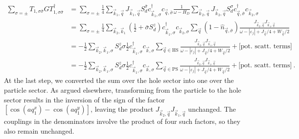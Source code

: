 \documentclass{revtex4-2}
\begin{document}
\begin{equation}\begin{aligned}\label{t1t1h}
	\sum_{\sigma=\pm}T_{1,\sigma\bar\sigma} G T^\dagger_{1,\sigma\bar\sigma} &= \sum_{\sigma=\pm}\frac{1}{4} \sum_{\vec k_1,\vec q}J_{\vec k_1,\vec q} S_d^{\bar\sigma} c^\dagger_{\vec k_1,\sigma} c_{\vec q,\bar\sigma} \frac{1}{\omega - H_D}\sum_{\vec k_2,\vec q}J_{\vec k_2,\vec q} S_d^\sigma c^\dagger_{\vec q,\bar\sigma} c_{\vec k_2,\sigma}\\
										 &= \sum_{\sigma=\pm}\frac{1}{4}\sum_{\vec k_2,\vec k_1} \left(\frac{1}{2} + \bar\sigma S_d^z\right) c^\dagger_{\vec k_1,\sigma} c_{\vec k_2,\sigma} \sum_{\vec q} \left(1 - \hat n_{\vec q,\bar\sigma}\right) \frac{J_{\vec k_2,\vec q} J_{\vec k_1,\vec q}}{\omega - |\varepsilon_j| + J_{\vec q}/4 + W_{\vec q}/2}\\
										 &= -\frac{1}{2}\sum_{\vec k_2,\vec k_1, \sigma} S_d^z \sigma \frac{1}{2}c^\dagger_{\vec k_1,\sigma}c_{\vec k,\sigma} \sum_{\vec q \in \text{HS}} \frac{J_{\vec k_2,\vec q} J_{\vec k_1,\vec q}}{\omega - |\varepsilon_j| + J_{\vec q}/4 + W_{\vec q}/2} + \bigg[\text{pot. scatt. terms}\bigg]\\
										 &= -\frac{1}{2}\sum_{\vec k_2,\vec k_1, \sigma} S_d^z \sigma \frac{1}{2}c^\dagger_{\vec k_1,\sigma}c_{\vec k,\sigma} \sum_{\vec q \in \text{PS}} \frac{J_{\vec k_2,\vec q} J_{\vec k_1,\vec q}}{\omega - |\varepsilon_j| + J_{\vec q}/4 + W_{\vec q}/2} + \bigg[\text{pot. scatt. terms}\bigg]~.
\end{aligned}\end{equation}
At the last step, we converted the sum over the hole sector into one over the particle sector. As argued elsewhere, transforming from the particle to the hole sector results in the inversion of the sign of the factor \(\left[\cos\left( aq_1^x \right) - \cos\left( aq_1^y \right) \right]\), leaving the product \(J_{\vec k_2,\vec q} J_{\vec k_1,\vec q}\) unchanged. The couplings in the denominators involve the product of four such factors, so they also remain unchanged.
\end{document}
